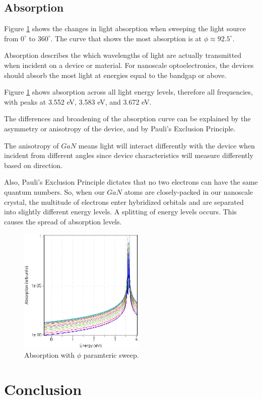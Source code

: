 \documentclass{IEEEtran}
\begin{document}
\subsection{Absorption}

Figure \ref{fig:absorption} shows the changes in light absorption when sweeping the light source from \(0^\circ\) to \(360^\circ\). The curve that shows the most absorption is at \(\phi \approx 92.5^\circ\).

Absorption describes the which wavelengths of light are actually transmitted when incident on a device or material. For nanoscale optoelectronics, the devices should absorb the most light at energies equal to the bandgap or above.

Figure \ref{fig:absorption} shows absorption across all light energy levels, therefore all frequencies, with peaks at 3.552 eV, 3.583 eV, and 3.672 eV. 

The differences and broadening of the absorption curve can be explained by the asymmetry or anisotropy of the device, and by Pauli's Exclusion Principle.

The anisotropy of \(GaN\) means light will interact differently with the device when incident from different angles since device characteristics will measure differently based on direction. 

Also, Pauli's Exclusion Principle dictates that no two electrons can have the same quantum numbers. So, when our \(GaN\) atoms are closely-packed in our nanoscale crystal, the multitude of electrons enter hybridized orbitals and are separated into slightly different energy levels. A splitting of energy levels occurs. This causes the spread of absorption levels.

\begin{figure}[!h] 
    \centering
    \includegraphics*[width = 6cm]{AbsorptionSweepAnglephi.png}
    \caption{Absorption with \(\phi\) paramteric sweep.}
    \label{fig:absorption}
\end{figure}    

 \section{Conclusion}



\end{document}
